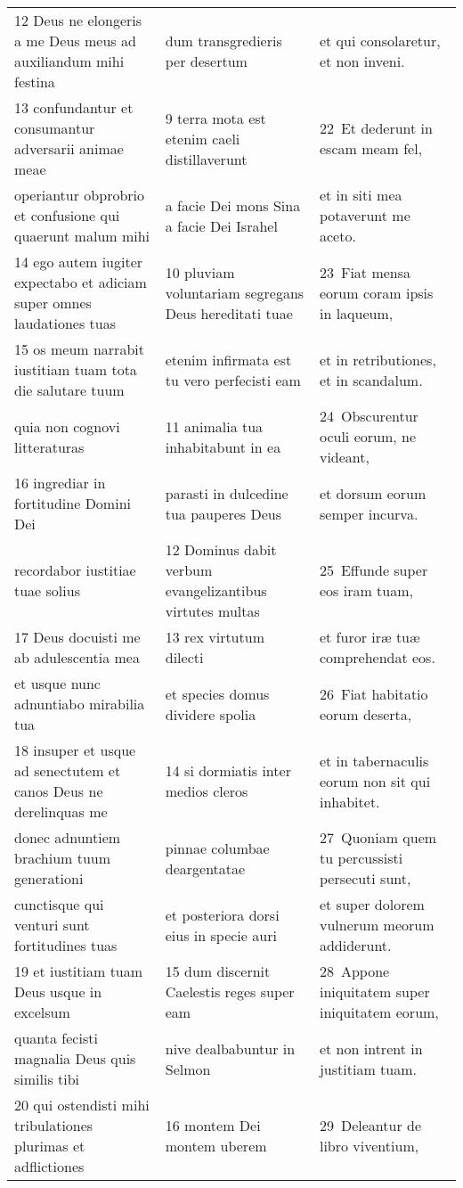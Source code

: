 \documentclass{article}
\begin{document}
\begin{longtable}{@{}p{}p{}p{}@{}}
12 Deus ne elongeris a me Deus meus ad auxiliandum mihi festina	&	dum transgredieris per desertum	&	et qui consolaretur, et non inveni.	\\
13 confundantur et consumantur adversarii animae meae	&	9 terra mota est etenim caeli distillaverunt	&	22 Et dederunt in escam meam fel,	\\
operiantur obprobrio et confusione qui quaerunt malum mihi	&	a facie Dei mons Sina a facie Dei Israhel	&	et in siti mea potaverunt me aceto.	\\
14 ego autem iugiter expectabo et adiciam super omnes laudationes tuas	&	10 pluviam voluntariam segregans Deus hereditati tuae	&	23 Fiat mensa eorum coram ipsis in laqueum,	\\
15 os meum narrabit iustitiam tuam tota die salutare tuum	&	etenim infirmata est tu vero perfecisti eam	&	et in retributiones, et in scandalum.	\\
quia non cognovi litteraturas	&	11 animalia tua inhabitabunt in ea	&	24 Obscurentur oculi eorum, ne videant,	\\
16 ingrediar in fortitudine Domini Dei	&	parasti in dulcedine tua pauperes Deus	&	et dorsum eorum semper incurva.	\\
recordabor iustitiae tuae solius	&	12 Dominus dabit verbum evangelizantibus virtutes multas	&	25 Effunde super eos iram tuam,	\\
17 Deus docuisti me ab adulescentia mea	&	13 rex virtutum dilecti	&	et furor iræ tuæ comprehendat eos.	\\
et usque nunc adnuntiabo mirabilia tua	&	et species domus dividere spolia	&	26 Fiat habitatio eorum deserta,	\\
18 insuper et usque ad senectutem et canos Deus ne derelinquas me	&	14 si dormiatis inter medios cleros	&	et in tabernaculis eorum non sit qui inhabitet.	\\
donec adnuntiem brachium tuum generationi	&	pinnae columbae deargentatae	&	27 Quoniam quem tu percussisti persecuti sunt,	\\
cunctisque qui venturi sunt fortitudines tuas	&	et posteriora dorsi eius in specie auri	&	et super dolorem vulnerum meorum addiderunt.	\\
19 et iustitiam tuam Deus usque in excelsum	&	15 dum discernit Caelestis reges super eam	&	28 Appone iniquitatem super iniquitatem eorum,	\\
quanta fecisti magnalia Deus quis similis tibi	&	nive dealbabuntur in Selmon	&	et non intrent in justitiam tuam.	\\
20 qui ostendisti mihi tribulationes plurimas et adflictiones	&	16 montem Dei montem uberem	&	29 Deleantur de libro viventium,	\\

\end{longtable}
\end{document}
